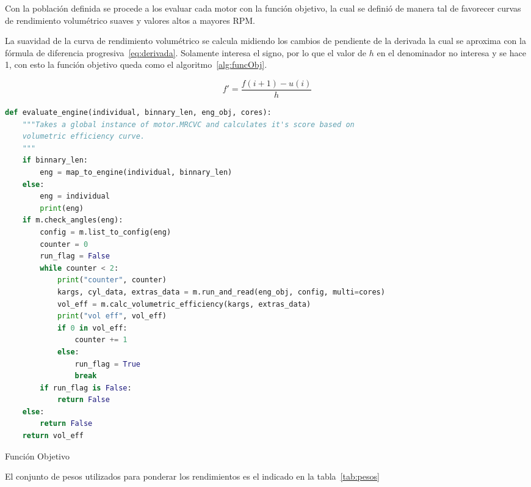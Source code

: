 

Con la población definida se procede a los evaluar cada motor con la función
objetivo, la cual se definió de manera tal de favorecer curvas de rendimiento
volumétrico suaves y valores altos a mayores RPM.\@

La suavidad de la curva de rendimiento volumétrico se calcula midiendo los
cambios de pendiente de la derivada la cual se aproxima con la fórmula de
diferencia progresiva~\ref{eq:derivada}.
%
Solamente interesa el signo, por lo que el valor de $h$ en el denominador no
interesa y se hace 1, con esto la función objetivo queda como el
algoritmo~\ref{alg:funcObj}.

\begin{equation}\label{eq:derivada}
  f' = \frac{f(i+1) - u(i)}{h}
\end{equation}

\begin{lstlisting}[language=Python]
def evaluate_engine(individual, binnary_len, eng_obj, cores):
    """Takes a global instance of motor.MRCVC and calculates it's score based on
    volumetric efficiency curve.
    """
    if binnary_len:
        eng = map_to_engine(individual, binnary_len)
    else:
        eng = individual
        print(eng)
    if m.check_angles(eng):
        config = m.list_to_config(eng)
        counter = 0
        run_flag = False
        while counter < 2:
            print("counter", counter)
            kargs, cyl_data, extras_data = m.run_and_read(eng_obj, config, multi=cores)
            vol_eff = m.calc_volumetric_efficiency(kargs, extras_data)
            print("vol eff", vol_eff)
            if 0 in vol_eff:
                counter += 1
            else:
                run_flag = True
                break
        if run_flag is False:
            return False
    else:
        return False
    return vol_eff
\end{lstlisting}

\begin{algorithm}\caption{Función Objetivo}\label{algo:func_obj}
  \SetAlgoLined
\end{algorithm}

El conjunto de pesos utilizados para ponderar los rendimientos es el indicado
en la tabla~\ref{tab:pesos}


